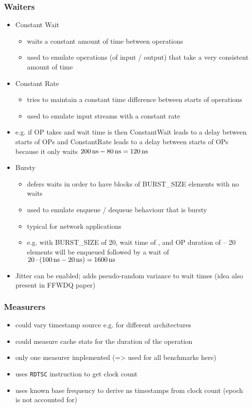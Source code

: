 \subsubsection{Waiters}
\begin{itemize}
    \item Constant Wait
        \begin{itemize}
            \item waits a constant amount of time between operations
            \item used to emulate operations (of input / output) that take a very consistent amount of time
        \end{itemize}
    \item Constant Rate
        \begin{itemize}
            \item tries to maintain a constant time difference between starts of operations
            \item used to emulate input streams with a constant rate
        \end{itemize}
    \item e.g. if OP takes  and wait time is  then ConstantWait leads to a  delay
        between starts of OPs and ConstantRate leads to a  delay between starts of OPs because it
        only waits $\SI{200}{\nano\second}-\SI{80}{\nano\second}=\SI{120}{\nano\second}$
    \item Bursty
        \begin{itemize}
            \item defers waits in order to have blocks of BURST\_SIZE elements with no waits
            \item used to emulate enqueue / dequeue behaviour that is bursty
            \item typical for network applications
            \item e.g. with BURST\_SIZE of 20, wait time of , and OP duration of  -- 20
                elements will be enqueued followed by a wait of $20\cdot(\SI{100}{\nano\second} - \SI{20}{\nano\second}) = \SI{1600}{\nano\second}$
        \end{itemize}
    \item Jitter can be enabled; adds pseudo-random variance to wait times (idea also present in FFWDQ paper)
\end{itemize}

\subsubsection{Measurers}
\begin{itemize}
    \item could vary timestamp source e.g. for different architectures
    \item could measure cache stats for the duration of the operation
    \item only one measurer implemented (=> used for all benchmarks here)
    \item uses \texttt{RDTSC} instruction to get clock count
    \item uses known base frequency to derive ns timestamps from clock count (epoch is not accounted for)
\end{itemize}
